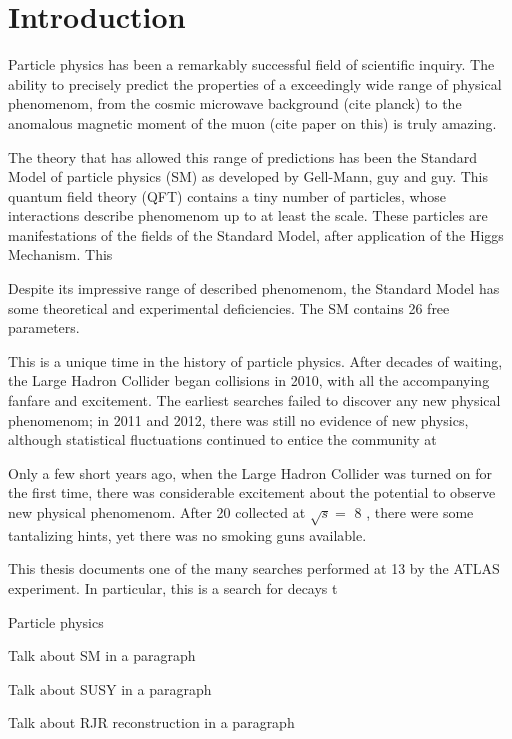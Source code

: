 
\chapter{Introduction}


Particle physics has been a remarkably successful field of scientific inquiry.
The ability to precisely predict the properties of a exceedingly wide range of physical phenomenom, from the cosmic microwave background (cite planck) to the anomalous magnetic moment of the muon (cite paper on this) is truly amazing.

The theory that has allowed this range of predictions has been the Standard Model of particle physics (SM) as developed by Gell-Mann, guy and guy.
This quantum field theory (QFT) contains a tiny number of particles, whose interactions describe phenomenom up to at least the \TeV\xspace scale.
These particles are manifestations of the fields of the Standard Model, after application of the Higgs Mechanism.
This 

Despite its impressive range of described phenomenom, the Standard Model has some theoretical and experimental deficiencies.
The SM contains 26 free parameters. \footnotemark {}

This is a unique time in the history of particle physics.
After decades of waiting, the Large Hadron Collider began collisions in 2010, with all the accompanying fanfare and excitement.
The earliest searches failed to discover any new physical phenomenom; in 2011 and 2012, there was still no evidence of new physics, although statistical fluctuations continued to entice the community at 

Only a few short years ago, when the Large Hadron Collider was turned on for the first time, there was considerable excitement about the potential to observe new physical phenomenom.
After 20 \ifb collected at $\sqrt{s} = $ 8 \TeV , there were some tantalizing hints, yet there was no smoking guns available.


This thesis documents one of the many searches performed at 13 \TeV by the ATLAS experiment.
In particular, this is a search for decays t

Particle physics 

Talk about SM in a paragraph

Talk about SUSY in a paragraph

Talk about RJR reconstruction in a paragraph
